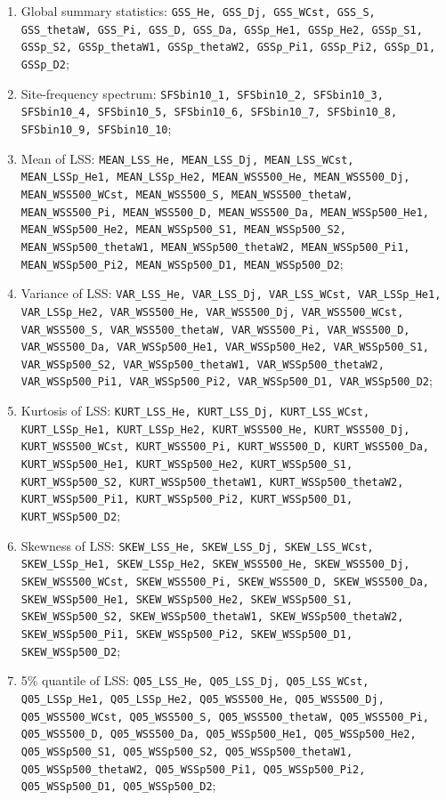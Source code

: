 \documentclass[12pt]{article}
\begin{document}
\begin{enumerate}
    \item Global summary statistics: \texttt{GSS\_He, GSS\_Dj, GSS\_WCst, GSS\_S, GSS\_thetaW, GSS\_Pi, GSS\_D, GSS\_Da, GSSp\_He1, GSSp\_He2, GSSp\_S1, GSSp\_S2, GSSp\_thetaW1, GSSp\_thetaW2, GSSp\_Pi1, GSSp\_Pi2, GSSp\_D1, GSSp\_D2};
    \item Site-frequency spectrum: \texttt{SFSbin10\_1, SFSbin10\_2, SFSbin10\_3, SFSbin10\_4, SFSbin10\_5, SFSbin10\_6, SFSbin10\_7, SFSbin10\_8, SFSbin10\_9, SFSbin10\_10};
    \item Mean of LSS: \texttt{MEAN\_LSS\_He, MEAN\_LSS\_Dj, MEAN\_LSS\_WCst, MEAN\_LSSp\_He1, MEAN\_LSSp\_He2, MEAN\_WSS500\_He, MEAN\_WSS500\_Dj, MEAN\_WSS500\_WCst, MEAN\_WSS500\_S, MEAN\_WSS500\_thetaW, MEAN\_WSS500\_Pi, MEAN\_WSS500\_D, MEAN\_WSS500\_Da, MEAN\_WSSp500\_He1, MEAN\_WSSp500\_He2, MEAN\_WSSp500\_S1, MEAN\_WSSp500\_S2, MEAN\_WSSp500\_thetaW1, MEAN\_WSSp500\_thetaW2, MEAN\_WSSp500\_Pi1, MEAN\_WSSp500\_Pi2, MEAN\_WSSp500\_D1, MEAN\_WSSp500\_D2};
    \item Variance of LSS: \texttt{VAR\_LSS\_He, VAR\_LSS\_Dj, VAR\_LSS\_WCst, VAR\_LSSp\_He1, VAR\_LSSp\_He2, VAR\_WSS500\_He, VAR\_WSS500\_Dj, VAR\_WSS500\_WCst, VAR\_WSS500\_S, VAR\_WSS500\_thetaW, VAR\_WSS500\_Pi, VAR\_WSS500\_D, VAR\_WSS500\_Da, VAR\_WSSp500\_He1, VAR\_WSSp500\_He2, VAR\_WSSp500\_S1, VAR\_WSSp500\_S2, VAR\_WSSp500\_thetaW1, VAR\_WSSp500\_thetaW2, VAR\_WSSp500\_Pi1, VAR\_WSSp500\_Pi2, VAR\_WSSp500\_D1, VAR\_WSSp500\_D2};
    \item Kurtosis of LSS: \texttt{KURT\_LSS\_He, KURT\_LSS\_Dj, KURT\_LSS\_WCst, KURT\_LSSp\_He1, KURT\_LSSp\_He2, KURT\_WSS500\_He, KURT\_WSS500\_Dj, KURT\_WSS500\_WCst, KURT\_WSS500\_Pi, KURT\_WSS500\_D, KURT\_WSS500\_Da, KURT\_WSSp500\_He1, KURT\_WSSp500\_He2, KURT\_WSSp500\_S1, KURT\_WSSp500\_S2, KURT\_WSSp500\_thetaW1, KURT\_WSSp500\_thetaW2, KURT\_WSSp500\_Pi1, KURT\_WSSp500\_Pi2, KURT\_WSSp500\_D1, KURT\_WSSp500\_D2};
    \item Skewness of LSS: \texttt{SKEW\_LSS\_He, SKEW\_LSS\_Dj, SKEW\_LSS\_WCst, SKEW\_LSSp\_He1, SKEW\_LSSp\_He2, SKEW\_WSS500\_He, SKEW\_WSS500\_Dj, SKEW\_WSS500\_WCst, SKEW\_WSS500\_Pi, SKEW\_WSS500\_D, SKEW\_WSS500\_Da, SKEW\_WSSp500\_He1, SKEW\_WSSp500\_He2, SKEW\_WSSp500\_S1, SKEW\_WSSp500\_S2, SKEW\_WSSp500\_thetaW1, SKEW\_WSSp500\_thetaW2, SKEW\_WSSp500\_Pi1, SKEW\_WSSp500\_Pi2, SKEW\_WSSp500\_D1, SKEW\_WSSp500\_D2};
    \item 5\% quantile of LSS: \texttt{Q05\_LSS\_He, Q05\_LSS\_Dj, Q05\_LSS\_WCst, Q05\_LSSp\_He1,  Q05\_LSSp\_He2, Q05\_WSS500\_He, Q05\_WSS500\_Dj, Q05\_WSS500\_WCst, Q05\_WSS500\_S,         Q05\_WSS500\_thetaW, Q05\_WSS500\_Pi, Q05\_WSS500\_D, Q05\_WSS500\_Da, Q05\_WSSp500\_He1,     Q05\_WSSp500\_He2, Q05\_WSSp500\_S1, Q05\_WSSp500\_S2, Q05\_WSSp500\_thetaW1, Q05\_WSSp500\_thetaW2, Q05\_WSSp500\_Pi1, Q05\_WSSp500\_Pi2, Q05\_WSSp500\_D1, Q05\_WSSp500\_D2};

\end{enumerate}
\end{document}
